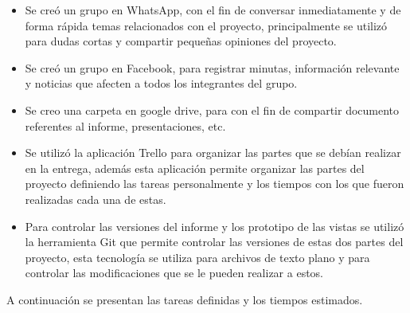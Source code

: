 \documentclass{memoria}
\begin{document}
\begin{itemize}
	\item Se creó un grupo en WhatsApp, con el fin de conversar inmediatamente y de forma rápida temas relacionados con el proyecto, principalmente se utilizó para dudas cortas y compartir pequeñas opiniones del proyecto. 
	\item Se creó un grupo en Facebook, para registrar minutas, información relevante y noticias que afecten a todos los integrantes del grupo.
	\item Se creo una carpeta en google drive, para con el fin de compartir documento referentes al informe, presentaciones, etc.  
	\item Se utilizó la aplicación Trello para organizar las partes que se debían realizar en la entrega, además esta aplicación permite organizar las partes del proyecto definiendo las tareas personalmente y los tiempos con los que fueron realizadas cada una de estas.
	\item Para controlar las versiones del informe y los prototipo de las vistas se utilizó la herramienta Git que permite controlar las versiones de estas dos partes del proyecto, esta tecnología se utiliza para archivos de texto plano y para controlar las modificaciones que se le pueden realizar a estos.
\end{itemize}

\newpage

A continuación se presentan las tareas definidas y los tiempos estimados.

\end{document}
